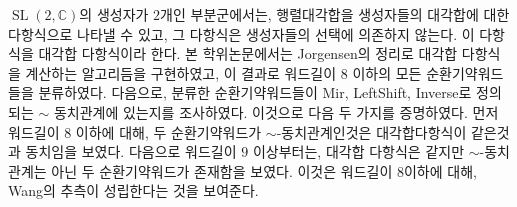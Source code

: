 \documentclass[12pt,reqno,letter,oneside,openright]{book}
\newcommand{\ssl}{\operatorname{SL}(2,\mathbb{C})}
\numberwithin{equation}{chapter}
\theoremstyle{definition}
\begin{document}
\begin{KoreanAbstract}
\par 
{}
$\ssl$의 생성자가 $2$개인 부분군에서는, 행렬대각합을 생성자들의 대각합에 대한 다항식으로 나타낼 수 있고, 그 다항식은 생성자들의 선택에 의존하지 않는다. 이 다항식을 대각합 다항식이라 한다. 본 학위논문에서는 Jorgensen의 정리로 대각합 다항식을 계산하는 알고리듬을 구현하였고, 이 결과로 워드길이 $8$ 이하의 모든 순환기약워드들을 분류하였다. 다음으로, 분류한 순환기약워드들이 Mir, LeftShift, Inverse로 정의되는 $\sim$ 동치관계에 있는지를 조사하였다. 이것으로 다음 두 가지를 증명하였다. 먼저 워드길이 $8$ 이하에 대해, 두 순환기약워드가 $\sim$-동치관계인것은 대각합다항식이 같은것과 동치임을 보였다. 다음으로 워드길이 $9$ 이상부터는, 대각합 다항식은 같지만 $\sim$-동치관계는 아닌 두 순환기약워드가 존재함을 보였다. 이것은 워드길이 $8$이하에 대해, Wang의 
추측이 성립한다는 것을 보여준다.
\end{KoreanAbstract}
\end{document}
